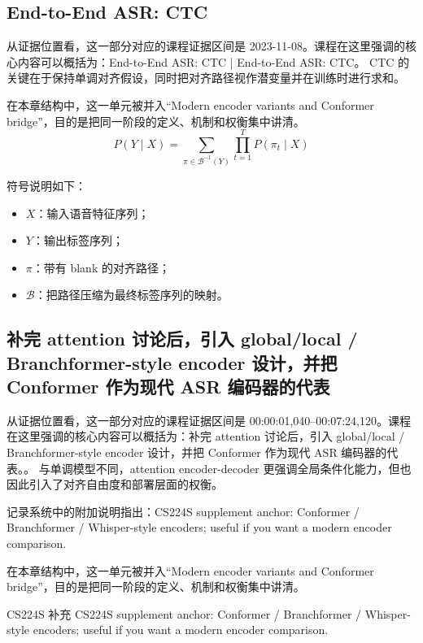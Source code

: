 \documentclass[a4paper]{article}
\begin{document}
\subsection{End-to-End ASR: CTC}
从证据位置看，这一部分对应的课程证据区间是 2023-11-08。课程在这里强调的核心内容可以概括为：End-to-End ASR: CTC | End-to-End ASR: CTC。
CTC 的关键在于保持单调对齐假设，同时把对齐路径视作潜变量并在训练时进行求和。

在本章结构中，这一单元被并入“Modern encoder variants and Conformer bridge”，目的是把同一阶段的定义、机制和权衡集中讲清。
\[
P(Y \mid X) = \sum_{\pi \in \mathcal{B}^{-1}(Y)} \prod_{t=1}^{T} P(\pi_t \mid X)
\]

符号说明如下：
\begin{itemize}
\item $X$：输入语音特征序列；
\item $Y$：输出标签序列；
\item $\pi$：带有 blank 的对齐路径；
\item $\mathcal{B}$：把路径压缩为最终标签序列的映射。
\end{itemize}

\subsection{补完 attention 讨论后，引入 global/local / Branchformer-style encoder 设计，并把 Conformer 作为现代 ASR 编码器的代表}
从证据位置看，这一部分对应的课程证据区间是 00:00:01,040--00:07:24,120。课程在这里强调的核心内容可以概括为：补完 attention 讨论后，引入 global/local / Branchformer-style encoder 设计，并把 Conformer 作为现代 ASR 编码器的代表。。
与单调模型不同，attention encoder-decoder 更强调全局条件化能力，但也因此引入了对齐自由度和部署层面的权衡。

记录系统中的附加说明指出：CS224S supplement anchor: Conformer / Branchformer / Whisper-style encoders; useful if you want a modern encoder comparison.

在本章结构中，这一单元被并入“Modern encoder variants and Conformer bridge”，目的是把同一阶段的定义、机制和权衡集中讲清。
\begin{knowledgebox}{CS224S 补充}
CS224S supplement anchor: Conformer / Branchformer / Whisper-style encoders; useful if you want a modern encoder comparison.
\end{knowledgebox}
\end{document}
